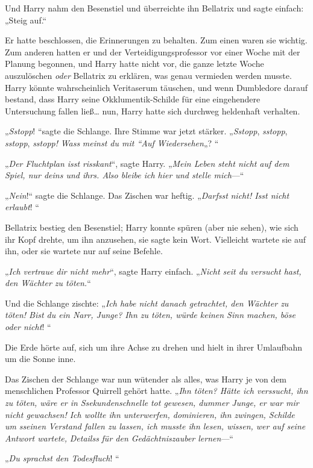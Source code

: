 {Und Harry nahm den Besenstiel und überreichte ihn Bellatrix und sagte einfach: „Steig auf.“

Er hatte beschlossen, die Erinnerungen zu behalten. Zum einen waren sie wichtig. Zum anderen hatten er und der Verteidigungsprofessor vor einer Woche mit der Planung begonnen, und Harry hatte nicht vor, die ganze letzte Woche auszulöschen \emph{oder} Bellatrix zu erklären, was genau vermieden werden musste. Harry könnte wahrscheinlich Veritaserum täuschen, und wenn Dumbledore darauf bestand, dass Harry seine Okklumentik-Schilde für eine eingehendere Untersuchung fallen ließ… nun, Harry hatte sich durchweg heldenhaft verhalten.

„\emph{Sstopp}! “sagte die Schlange. Ihre Stimme war jetzt stärker. „\emph{Sstopp}, \emph{sstopp}, \emph{sstopp}, \emph{sstopp!} \emph{Wass} \emph{meinst du mit “Auf Wiedersehen}„? “

„\emph{Der Fluchtplan isst} \emph{risskant}“, sagte Harry. „\emph{Mein Leben steht nicht auf dem Spiel, nur deins und ihrs. Also bleibe ich hier und stelle mich}—“

„\emph{Nein}!“ sagte die Schlange. Das Zischen war heftig. „\emph{Darfsst} \emph{nicht! Isst nicht erlaubt}! “

Bellatrix bestieg den Besenstiel; Harry konnte spüren (aber nie sehen), wie sich ihr Kopf drehte, um ihn anzusehen, sie sagte kein Wort. Vielleicht wartete sie auf ihn, oder sie wartete nur auf seine Befehle.

„\emph{Ich vertraue dir nicht mehr}“, sagte Harry einfach. „\emph{Nicht seit du versucht hast, den Wächter zu töten.}“

Und die Schlange zischte: „\emph{Ich habe nicht danach getrachtet, den Wächter zu töten! Bist du ein Narr, Junge? Ihn zu töten, würde keinen Sinn machen, böse oder nicht}! “

Die Erde hörte auf, sich um ihre Achse zu drehen und hielt in ihrer Umlaufbahn um die Sonne inne.

Das Zischen der Schlange war nun wütender als alles, was Harry je von dem menschlichen Professor Quirrell gehört hatte. „\emph{Ihn töten? Hätte ich verssucht, ihn zu töten, wäre er in} \emph{Ssekundenschnelle} \emph{tot gewesen, dummer Junge, er war mir nicht gewachsen! Ich wollte ihn unterwerfen, dominieren, ihn zwingen, Schilde um} \emph{sseinen} \emph{Verstand fallen zu lassen, ich musste ihn lesen, wissen, wer auf seine Antwort wartete,} \emph{Detailss} \emph{für den Gedächtniszauber lernen}—“

„\emph{Du sprachst den Todesfluch}! “

}
